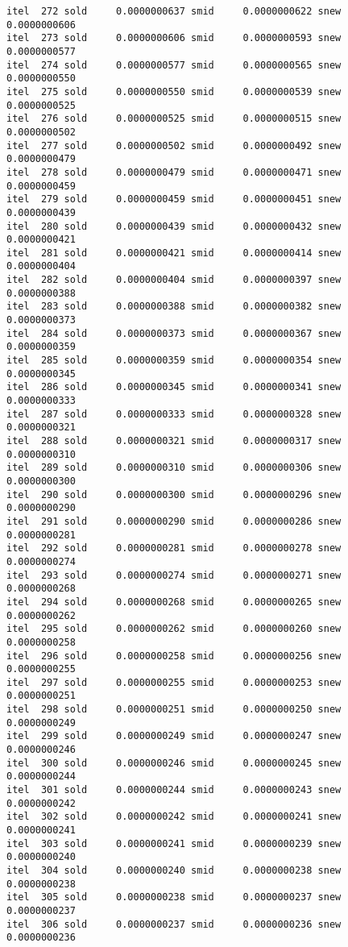 \documentclass[
  12pt,
  letterpaper,
  DIV=11,
  numbers=noendperiod]{scrartcl}
\begin{document}
\begin{verbatim}
itel  272 sold     0.0000000637 smid     0.0000000622 snew     0.0000000606 
itel  273 sold     0.0000000606 smid     0.0000000593 snew     0.0000000577 
itel  274 sold     0.0000000577 smid     0.0000000565 snew     0.0000000550 
itel  275 sold     0.0000000550 smid     0.0000000539 snew     0.0000000525 
itel  276 sold     0.0000000525 smid     0.0000000515 snew     0.0000000502 
itel  277 sold     0.0000000502 smid     0.0000000492 snew     0.0000000479 
itel  278 sold     0.0000000479 smid     0.0000000471 snew     0.0000000459 
itel  279 sold     0.0000000459 smid     0.0000000451 snew     0.0000000439 
itel  280 sold     0.0000000439 smid     0.0000000432 snew     0.0000000421 
itel  281 sold     0.0000000421 smid     0.0000000414 snew     0.0000000404 
itel  282 sold     0.0000000404 smid     0.0000000397 snew     0.0000000388 
itel  283 sold     0.0000000388 smid     0.0000000382 snew     0.0000000373 
itel  284 sold     0.0000000373 smid     0.0000000367 snew     0.0000000359 
itel  285 sold     0.0000000359 smid     0.0000000354 snew     0.0000000345 
itel  286 sold     0.0000000345 smid     0.0000000341 snew     0.0000000333 
itel  287 sold     0.0000000333 smid     0.0000000328 snew     0.0000000321 
itel  288 sold     0.0000000321 smid     0.0000000317 snew     0.0000000310 
itel  289 sold     0.0000000310 smid     0.0000000306 snew     0.0000000300 
itel  290 sold     0.0000000300 smid     0.0000000296 snew     0.0000000290 
itel  291 sold     0.0000000290 smid     0.0000000286 snew     0.0000000281 
itel  292 sold     0.0000000281 smid     0.0000000278 snew     0.0000000274 
itel  293 sold     0.0000000274 smid     0.0000000271 snew     0.0000000268 
itel  294 sold     0.0000000268 smid     0.0000000265 snew     0.0000000262 
itel  295 sold     0.0000000262 smid     0.0000000260 snew     0.0000000258 
itel  296 sold     0.0000000258 smid     0.0000000256 snew     0.0000000255 
itel  297 sold     0.0000000255 smid     0.0000000253 snew     0.0000000251 
itel  298 sold     0.0000000251 smid     0.0000000250 snew     0.0000000249 
itel  299 sold     0.0000000249 smid     0.0000000247 snew     0.0000000246 
itel  300 sold     0.0000000246 smid     0.0000000245 snew     0.0000000244 
itel  301 sold     0.0000000244 smid     0.0000000243 snew     0.0000000242 
itel  302 sold     0.0000000242 smid     0.0000000241 snew     0.0000000241 
itel  303 sold     0.0000000241 smid     0.0000000239 snew     0.0000000240 
itel  304 sold     0.0000000240 smid     0.0000000238 snew     0.0000000238 
itel  305 sold     0.0000000238 smid     0.0000000237 snew     0.0000000237 
itel  306 sold     0.0000000237 smid     0.0000000236 snew     0.0000000236 
\end{verbatim}
\end{document}
